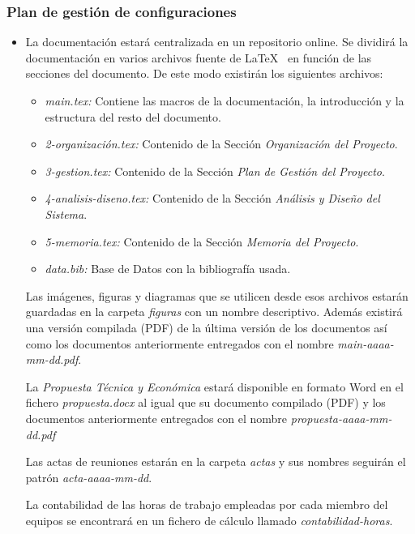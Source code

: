 \subsubsection{Plan de gestión de configuraciones}
\begin{itemize}
    \item La documentación estará centralizada en un repositorio online. Se dividirá la documentación en varios archivos fuente de \LaTeX~ en función de las secciones del documento. De este modo existirán los siguientes archivos:
		\begin{itemize}
			\item \textit{main.tex:} Contiene las macros de la documentación, la introducción y la estructura del resto del documento.
			\item \textit{2-organización.tex:} Contenido de la Sección \textit{Organización del Proyecto}.
			\item \textit{3-gestion.tex:} Contenido de la Sección \textit{Plan de Gestión del Proyecto}.
			\item \textit{4-analisis-diseno.tex:} Contenido de la Sección \textit{Análisis y Diseño del Sistema}.
			\item \textit{5-memoria.tex:} Contenido de la Sección \textit{Memoria del Proyecto}.
			\item \textit{data.bib:} Base de Datos con la bibliografía usada.
		\end{itemize}
		Las imágenes, figuras y diagramas que se utilicen desde esos archivos estarán guardadas en la carpeta \textit{figuras} con un nombre descriptivo. Además existirá una versión compilada (PDF) de la última versión de los documentos así como los documentos anteriormente entregados con el nombre \textit{main-aaaa-mm-dd.pdf}.

		La \textit{Propuesta Técnica y Económica} estará disponible en formato Word en el fichero \textit{propuesta.docx} al igual que su documento compilado (PDF) y los documentos anteriormente entregados con el nombre \textit{propuesta-aaaa-mm-dd.pdf}

		Las actas de reuniones estarán en la carpeta \textit{actas} y sus nombres seguirán el patrón \textit{acta-aaaa-mm-dd}.

		La contabilidad de las horas de trabajo empleadas por cada miembro del equipos se encontrará en un fichero de cálculo llamado \textit{contabilidad-horas}.


\end{itemize}

